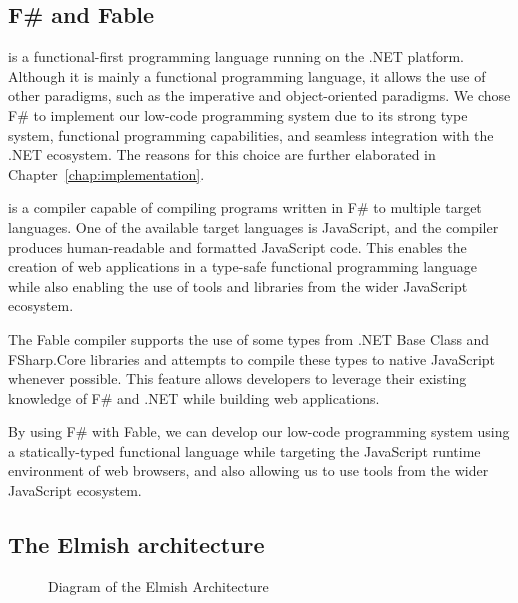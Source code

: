 \subsection{F\# and Fable}
\label{sub:Fable}

\citet{fsharp} is a functional-first programming language running on the .NET platform.
Although it is mainly a functional programming language, it allows the use of other paradigms, such as the imperative and object-oriented paradigms.
We chose F\# to implement our low-code programming system due to its strong type system, functional programming capabilities, and seamless integration with the .NET ecosystem.
The reasons for this choice are further elaborated in Chapter~\ref{chap:implementation}.

\citet{fable} is a compiler capable of compiling programs written in F\# to multiple target languages.
One of the available target languages is JavaScript, and the compiler produces human-readable and formatted JavaScript code.
This enables the creation of web applications in a type-safe functional programming language while also enabling the use of tools and libraries from the wider JavaScript ecosystem.

The Fable compiler supports the use of some types from .NET Base Class and FSharp.Core libraries \cite{fable-comp} and attempts to compile these types to native JavaScript whenever possible.
This feature allows developers to leverage their existing knowledge of F\# and .NET while building web applications.

By using F\# with Fable, we can develop our low-code programming system using a statically-typed functional language while targeting the JavaScript runtime environment of web browsers,
and also allowing us to use tools from the wider JavaScript ecosystem.

\subsection{The Elmish architecture}
\label{sub:elmish}

\begin{figure}[htbp]
	\caption{Diagram of the Elmish Architecture}
	\label{fig:elm}
\end{figure}

